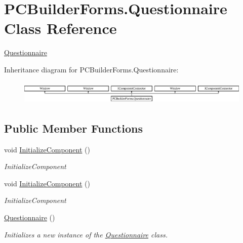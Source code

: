\hypertarget{class_p_c_builder_forms_1_1_questionnaire}{}\section{P\+C\+Builder\+Forms.\+Questionnaire Class Reference}
\label{class_p_c_builder_forms_1_1_questionnaire}


\hyperlink{class_p_c_builder_forms_1_1_questionnaire}{Questionnaire}  


Inheritance diagram for P\+C\+Builder\+Forms.\+Questionnaire\+:\begin{figure}[H]
\begin{center}
\leavevmode
\includegraphics[height=1.148718cm]{class_p_c_builder_forms_1_1_questionnaire}
\end{center}
\end{figure}
\subsection*{Public Member Functions}
\begin{DoxyCompactItemize}
\item 
void \hyperlink{class_p_c_builder_forms_1_1_questionnaire_a89db3c8c78b52416caa22372430d1e6e}{Initialize\+Component} ()
\begin{DoxyCompactList}\small\item\em Initialize\+Component \end{DoxyCompactList}\item 
void \hyperlink{class_p_c_builder_forms_1_1_questionnaire_a89db3c8c78b52416caa22372430d1e6e}{Initialize\+Component} ()
\begin{DoxyCompactList}\small\item\em Initialize\+Component \end{DoxyCompactList}\item 
\hyperlink{class_p_c_builder_forms_1_1_questionnaire_a8adf8b22d2427f03949f3df37f99ce2d}{Questionnaire} ()
\begin{DoxyCompactList}\small\item\em Initializes a new instance of the \hyperlink{class_p_c_builder_forms_1_1_questionnaire}{Questionnaire} class. \end{DoxyCompactList}\end{DoxyCompactItemize}
